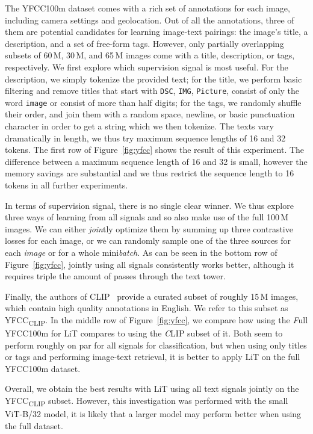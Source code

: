 \documentclass[10pt,twocolumn,letterpaper]{article}
\def \lit {LiT\xspace}
\begin{document}
The YFCC100m dataset comes with a rich set of annotations for each image, including camera settings and geolocation.
Out of all the annotations, three of them are potential candidates for learning image-text pairings: the image's title, a description, and a set of free-form tags.
However, only partially overlapping subsets of 60\,M, 30\,M, and 65\,M images come with a title, description, or tags, respectively.
We first explore which supervision signal is most useful.
For the description, we simply tokenize the provided text; for the title, we perform basic filtering and remove titles that start with {\tt DSC}, {\tt IMG}, {\tt Picture}, consist of only the word {\tt image} or consist of more than half digits; for the tags, we randomly shuffle their order, and join them with a random space, newline, or basic punctuation character in order to get a string which we then tokenize.
The texts vary dramatically in length, we thus try maximum sequence lengths of 16 and 32 tokens.
The first row of Figure~\ref{fig:yfcc} shows the result of this experiment.
The difference between a maximum sequence length of 16 and 32 is small, however the memory savings are substantial and we thus restrict the sequence length to 16 tokens in all further experiments.

In terms of supervision signal, there is no single clear winner. We thus explore three ways of learning from all signals and so also make use of the full 100\,M images. We can either \emph{join}tly optimize them by summing up three contrastive losses for each image, or we can randomly sample one of the three sources for each \emph{image} or for a whole mini\emph{batch}. As can be seen in the bottom row of Figure~\ref{fig:yfcc}, jointly using all signals consistently works better, although it requires triple the amount of passes through the text tower.

Finally, the authors of CLIP~\cite{clip} provide a curated subset of roughly 15\,M images, which contain high quality annotations in English. We refer to this subset as YFCC\textsubscript{CLIP}.
In the middle row of Figure~\ref{fig:yfcc}, we compare how using the \emph{F}ull YFCC100m for \lit compares to using the \emph{C}LIP subset of it. Both seem to perform roughly on par for all signals for classification, but when using only titles or tags and performing image-text retrieval, it is better to apply \lit on the full YFCC100m dataset.

Overall, we obtain the best results with \lit using all text signals jointly on the YFCC\textsubscript{CLIP} subset. However, this investigation was performed with the small ViT-B/32 model, it is likely that a larger model may perform better when using the full dataset.
\end{document}
